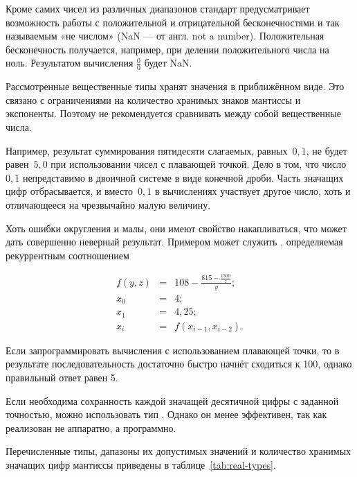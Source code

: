 Кроме самих чисел из различных диапазонов стандарт предусматривает
возможность работы с положительной и отрицательной бесконечностями и
так называемым «не числом» (NaN — от англ. not a
number). Положительная бесконечность получается, например, при делении
положительного числа на ноль. Результатом вычисления $\frac00$ будет
NaN.

Рассмотренные вещественные типы хранят значения в приближённом
виде. Это связано с ограничениями на количество хранимых знаков
мантиссы и экспоненты. Поэтому не рекомендуется сравнивать между собой
вещественные числа.

Например, результат суммирования пятидесяти слагаемых, равных~$0{,}1$,
не будет равен~$5{,}0$ при использовании чисел с плавающей
точкой. Дело в том, что число~$0{,}1$ непредставимо в двоичной системе
в виде конечной дроби. Часть значащих цифр отбрасывается, и
вместо~$0{,}1$ в вычислениях участвует другое число, хоть и
отличающееся на чрезвычайно малую величину.

Хоть ошибки округления и малы, они имеют свойство накапливаться, что
может дать совершенно неверный результат. Примером может служить
,
определяемая рекуррентным соотношением

\begin{eqnarray*}
f(y, z) &=& 108 - \frac{815 - \frac{1500}{z}}{y};\\
x_0 &=& 4;\\
x_1 &=& 4{,}25;\\
x_i &=& f(x_{i-1}, x_{i-2}).
\end{eqnarray*}

Если запрограммировать вычисления с использованием плавающей точки, то
в результате последовательность достаточно быстро начнёт сходиться к
100, однако правильный ответ равен 5.

Если необходима сохранность каждой значащей десятичной цифры с
заданной точностью, можно использовать тип . Однако он
менее эффективен, так как реализован не аппаратно, а программно.

Перечисленные типы, дапазоны их допустимых значений и количество
хранимых значащих цифр мантиссы приведены в
таблице~\ref{tab:real-types}.

